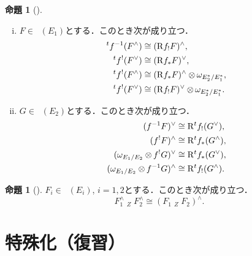 \documentclass[uplatex,dvipdfmx,a4paper,10pt,draft]{jsarticle}
\theoremstyle{definition}
\newcommand{\rr}{\mathbf{R}}
\numberwithin{equation}{section}
\newcommand{\Rder}{\mathrm{R}}
\newcommand{\tens}[1][]{\mathbin{\otimes_{\raise1.5ex\hbox to-.1em{}{#1}}}}
\newcommand{\etens}{\mathbin{\boxtimes}}
\newcommand{\letens}[1][]{\mathbin{\mathop{\overset{\mathrm{L}}{\etens}}_{#1}}}
\theoremstyle{mystyle}
\newtheorem{myprp}[mythm]{命題}
\newenvironment{prp}{\begin{prpbox}\begin{myprp}}{\end{myprp}\end{prpbox}}
\newcommand{\Dlcon}{\mathop{\mathsf{D}^{+}_{\rr_{>0}}}\nolimits}
\begin{document}
\begin{prp}[{\cite[Proposition 3.7.14]{KS90}}]
    \begin{enumerate}[(i)]
        \item \(F\in\Dlcon(E_1)\)とする．このとき次が成り立つ．
        \begin{align*}
            {}^tf^{-1}(F^\wedge)&\cong (\Rder{f}_!F)^\wedge,\\
            {}^tf^{!}(F^\vee)&\cong (\Rder{f}_\ast F)^\vee,\\
            {}^tf^{!}(F^\wedge)&\cong (\Rder{f}_{\ast}F)^\wedge\tens\omega_{E_2^\ast/E_1^\ast},\\
            {}^tf^{!}(F^\vee)&\cong (\Rder{f}_{!}F)^\vee\tens\omega_{E_2^\ast/E_1^\ast}.
        \end{align*}
        \item \(G\in\Dlcon(E_2)\)とする．このとき次が成り立つ．
        \begin{align*}
            (f^{-1}F)^\vee&\cong \Rder^t{f}_!(G^\vee),\\
            (f^{!}F)^\wedge&\cong \Rder^t{f}_\ast(G^\wedge),\\
            (\omega_{E_1/E_2}\tens f^!G)^\vee&\cong \Rder^t{f}_\ast(G^\vee),\\
            (\omega_{E_1/E_2}\tens f^{-1}G)^\wedge&\cong \Rder^t{f}_!(G^\wedge).
        \end{align*}
    \end{enumerate}
\end{prp}
\begin{prp}[{\cite[Proposition 3.7.15]{KS90}}]
    \(F_i\in\Dlcon(E_i)\), \(i=1,2\)とする．このとき次が成り立つ．
    \[
        F_1^\wedge\letens[Z]F_2^\wedge
        \cong
        \left(F_1\letens[Z]F_2\right)^\wedge.
    \]
\end{prp}

\section{特殊化（復習）{\cite[\S 4.2]{KS90}}}
\end{document}
